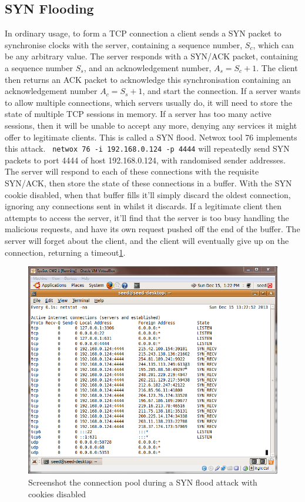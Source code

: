 \subsection{SYN Flooding}\label{sec_synflood}

In ordinary usage, to form a TCP connection a client sends a SYN packet to synchronise clocks with the server,
containing a sequence number, $S_c$, which can be any arbitrary value. The server responds with a SYN/ACK packet,
containing a sequence number $S_s$, and an acknowledgement number, $A_s = S_c+1$. The client then returns an ACK packet
to acknowledge this synchronisation containing an acknowledgement number $A_c = S_s+1$, and start the connection. If a
server wants to allow multiple connections, which servers usually do, it will need to store the state of multiple TCP
sessions in memory. If a server has too many active sessions, then it will be unable to accept any more, denying any
services it might offer to legitimate clients. This is called a SYN flood. Netwox tool 76 implements this attack. {\tt
netwox 76 -i 192.168.0.124 -p 4444} will repeatedly send SYN packets to port 4444 of host 192.168.0.124, with randomised
sender addresses. The server will respond to each of these connections with the requisite SYN/ACK, then store the state
of these connections in a buffer. With the SYN cookie disabled, when that buffer fills it'll simply discard the oldest
connection, ignoring any connections sent in whilst it discards. If a legitimate client then attempts to access the
server, it'll find that the server is too busy handling the malicious requests, and have its own request pushed off the
end of the buffer. The server will forget about the client, and the client will eventually give up on the connection,
returning a timeout\ref{fig:flood_no_cookie}.

\begin{figure}[h]
    \centering \includegraphics[width=.7\linewidth]{images/syn_flood_during.png}
    \caption{Screenshot the connection pool during a SYN flood attack with cookies disabled}
    \label{fig:flood_no_cookie}
\end{figure}


